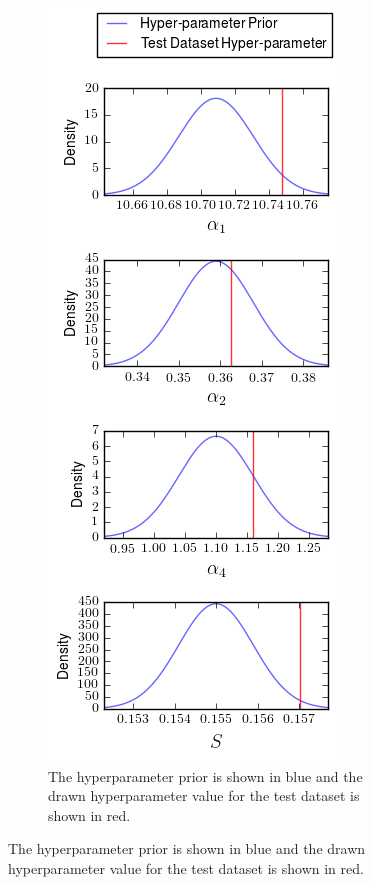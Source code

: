 \documentclass[\docopts]{\docclass}
\begin{document}
\begin{figure}[h!]
\begin{figure}[h]
\centering
\includegraphics[width=0.95\columnwidth]{drawn.png}
\caption{
The hyperparameter prior is shown in blue and the drawn hyperparameter value for the test dataset is shown in red.
\label{fig:drawn}}
\end{figure}



\end{figure}
\end{document}

